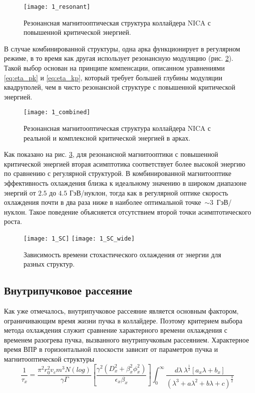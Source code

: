 \begin{figure}[!h]
  \centering
   \texttt{[image: 1\_resonant]}
   \caption{Резонансная магнитооптическая структура коллайдера NICA с повышенной критической энергией.}
   \label{fig:1_resonant}
\end{figure}

\par В случае комбинированной структуры, одна арка функционирует в регулярном режиме, в то время как другая использует резонансную модуляцию (рис. \ref{fig:1_combined}). Такой выбор основан на принципе компенсации, описанном уравнениями \ref{eq:eta_pk} и \ref{eq:eta_kp}, который требует большей глубины модуляции квадруполей, чем в чисто резонансной структуре с повышенной критической энергией.

\begin{figure}[!h]
  \centering
   \texttt{[image: 1\_combined]}
   \caption{Резонансная магнитооптическая структура коллайдера NICA с реальной и комплексной критической энергией в арках.}
   \label{fig:1_combined}
\end{figure}

\noindent Как показано на рис. \ref{fig:1_SC}, для резонансной магнитооптики с повышенной критической энергией вторая асимптотика соответствует более высокой энергию по сравнению с регулярной структурой. В комбинированной магнитооптике эффективность охлаждения близка к идеальному значению в широком диапазоне энергий от $2.5$ до $4.5$ ГэВ/нуклон, тогда как в регулярной оптике скорость охлаждения почти в два раза ниже в наиболее оптимальной точке~$\sim3$~ГэВ/нуклон. Такое поведение объясняется отсутствием второй точки асимптотического роста.

\begin{figure}[!h]
  \centering
   \texttt{[image: 1\_SC]}
   \texttt{[image: 1\_SC\_wide]}
   \caption{Зависимость времени стохастического охлаждения от энергии для разных структур.}
   \label{fig:1_SC}
\end{figure}

\subsection{Внутрипучковое рассеяние}\label{sec:ions_light/IBS_res_reg}

\par Как уже отмечалось, внутрипучковое рассеяние является основным фактором, ограничивающим время жизни пучка в коллайдере. Поэтому критерием выбора метода охлаждения служит сравнение характерного времени охлаждения с временем разогрева пучка, вызванного внутрипучковым рассеянием. Характерное время ВПР в горизонтальной плоскости зависит от параметров пучка и магнитооптической структуры
\begin{equation}
\frac{1}{\tau_x}=\frac{\pi^2r_0^2v_cm^3N\left(log\right)}{\gamma\Gamma}\left[\frac{\gamma^2\left(D_x^2+\beta_x^2\phi_x^2\right)}{\epsilon_x\beta_x}\right]\int_{0}^{\infty}\frac{d\lambda\ \lambda^\frac{1}{2}\left[a_x\lambda+b_x\right]}{\left(\lambda^3+a\lambda^2+b\lambda+c\right)^\frac{3}{2}}
\label{eq:IBS}
\end{equation}

